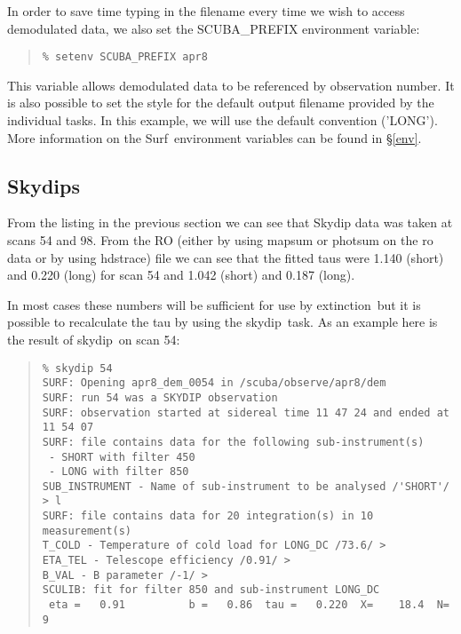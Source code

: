 \documentclass[twoside,11pt]{article}
\newcommand{\scusoft}          {{\sc Surf}}
\newcommand{\task}[1]{{\sf #1}}
\newcommand{\skydip}{\htmlref{\task{skydip}}{SKYDIP}}
\newcommand{\ext}{\htmlref{\task{extinction}}{EXTINCTION}}
\newcommand{\hdstrace}{\xref{\task{hdstrace}}{sun102}{}}
\newenvironment{myquote}{\begin{quote}\begin{small}}{\end{small}\end{quote}}
\newcommand{\htmlref}[2]{#1}
\newcommand{\xref}[3]{#1}
\begin{document}
In order to save time typing in the filename every time we wish to access 
demodulated data, we also set the SCUBA\_PREFIX environment variable:

\begin{myquote}
\begin{verbatim}
% setenv SCUBA_PREFIX apr8
\end{verbatim}
\end{myquote}

This variable allows demodulated data to be referenced by observation number.
It is also possible to set the style for the default output filename provided
by the individual tasks. In this example, we will use the default convention
('LONG'). More information on the \scusoft\ environment variables can be found 
in \S\ref{env}.



\subsection{Skydips}

From the listing in the previous section we can see that Skydip data 
was taken at scans 54 and 98. From the RO (either by using mapsum or
photsum on the ro data or by using \hdstrace) file we can see that the 
fitted taus were 1.140 (short) and 0.220 (long) for scan 54 and 1.042 (short)
and 0.187 (long).

In most cases these numbers will be sufficient for use by \ext\ but
it is possible to recalculate the tau by using the \skydip\ task. As an
example here is the result of \skydip\ on scan 54:

\begin{myquote}
\begin{verbatim}
% skydip 54
SURF: Opening apr8_dem_0054 in /scuba/observe/apr8/dem
SURF: run 54 was a SKYDIP observation
SURF: observation started at sidereal time 11 47 24 and ended at 11 54 07
SURF: file contains data for the following sub-instrument(s)
 - SHORT with filter 450
 - LONG with filter 850
SUB_INSTRUMENT - Name of sub-instrument to be analysed /'SHORT'/ > l
SURF: file contains data for 20 integration(s) in 10 measurement(s)
T_COLD - Temperature of cold load for LONG_DC /73.6/ > 
ETA_TEL - Telescope efficiency /0.91/ >
B_VAL - B parameter /-1/ > 
SCULIB: fit for filter 850 and sub-instrument LONG_DC
 eta =   0.91          b =   0.86  tau =   0.220  X=    18.4  N=    9
\end{verbatim}
\end{myquote}
\end{document}
